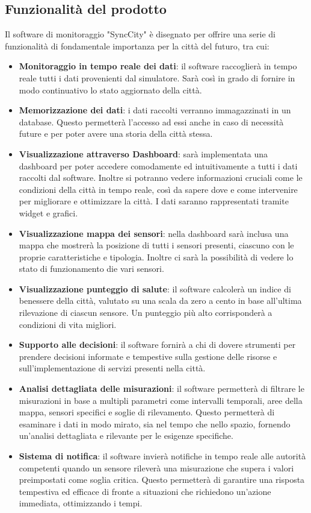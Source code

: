 \subsection{Funzionalità del prodotto}
Il software di monitoraggio "SyncCity" è disegnato per offrire una serie di funzionalità di fondamentale importanza per la città del futuro, tra cui:
\begin{itemize}
    \item \textbf{Monitoraggio in tempo reale dei dati}: il software raccoglierà in tempo reale tutti i dati provenienti dal simulatore. Sarà così in grado di fornire in modo continuativo lo stato aggiornato della città. 
    \item \textbf{Memorizzazione dei dati}: i dati raccolti verranno immagazzinati in un database. Questo permetterà l'accesso ad essi anche in caso di necessità future e  per poter avere una storia della città stessa.
    \item \textbf{Visualizzazione attraverso Dashboard}: sarà implementata una dashboard per poter accedere comodamente ed intuitivamente a tutti i dati raccolti dal software. Inoltre si potranno vedere informazioni cruciali come le condizioni della città in tempo reale, così da sapere dove e come intervenire per migliorare e ottimizzare la città. I dati saranno rappresentati tramite widget e grafici.
    \item \textbf{Visualizzazione mappa dei sensori}: nella dashboard sarà inclusa una mappa che mostrerà la posizione di tutti i sensori presenti, ciascuno con le proprie caratteristiche e tipologia. Inoltre ci sarà la possibilità di vedere lo stato di funzionamento die vari sensori.
    \item \textbf{Visualizzazione punteggio di salute}: il software calcolerà un indice di benessere della città, valutato su una scala da zero a cento in base all'ultima rilevazione di ciascun sensore. Un punteggio più alto corrisponderà a condizioni di vita migliori.
    \item \textbf{Supporto alle decisioni}: il software fornirà a chi di dovere strumenti per prendere decisioni informate e tempestive sulla gestione delle risorse e sull’implementazione di servizi presenti nella città.
    \item \textbf{Analisi dettagliata delle misurazioni}: il software permetterà di filtrare le misurazioni in base a multipli parametri come intervalli temporali, aree della mappa, sensori specifici e soglie di rilevamento. Questo permetterà di esaminare i dati in modo mirato, sia nel tempo che nello spazio, fornendo un’analisi dettagliata e rilevante per le esigenze specifiche.
    \item \textbf{Sistema di notifica}: il software invierà notifiche in tempo reale alle autorità competenti quando un sensore rileverà una misurazione che supera i valori preimpostati come soglia critica. Questo permetterà di garantire una risposta tempestiva ed efficace di fronte a situazioni che richiedono un’azione immediata, ottimizzando i tempi.
\end{itemize}

